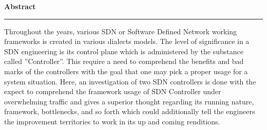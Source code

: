 \setlength{\headsep}{0.4in}
\vspace*{5cm}
\begin{center}

{\bf \LARGE Abstract}

\end{center}

{\noindent \rule{\linewidth}{1mm}} \vspace{0.25in}

\par
Throughout the years, various SDN or Software Defined Network working frameworks is created in various dialects models. The level of significance in a SDN engineering is its control plane which is administered by the substance called ''Controller''. This require a need to comprehend the benefits and bad marks of the controllers with the goal that one may pick a proper usage for a system situation. Here, an investigation of two SDN controllers is done with the expect to comprehend the framework usage of SDN Controller under overwhelming traffic and gives a superior thought regarding its running nature, framework, bottlenecks, and so forth which could additionally tell the engineers the improvement territories to work in its up and coming renditions.
\vspace*{\fill}
\pagebreak